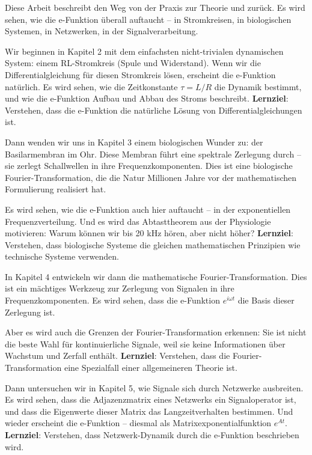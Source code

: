 ﻿\documentclass[a4paper,12pt]{report}
\theoremstyle{definition}
\begin{document}
	Diese Arbeit beschreibt den Weg von der Praxis zur Theorie und zurück. Es wird sehen, wie die e-Funktion überall auftaucht -- in Stromkreisen, in biologischen Systemen, in Netzwerken, in der Signalverarbeitung.
	
	Wir beginnen in Kapitel 2 mit dem einfachsten nicht-trivialen dynamischen System: einem RL-Strom\-kreis (Spule und Widerstand). Wenn wir die Differentialgleichung für diesen Stromkreis lösen, erscheint die e-Funktion natürlich. Es wird sehen, wie die Zeitkonstante $\tau = L/R$ die Dynamik bestimmt, und wie die e-Funktion Aufbau und Abbau des Stroms beschreibt. \textbf{Lernziel}: Verstehen, dass die e-Funktion die natürliche Lösung von Differentialgleichungen ist.
	
	Dann wenden wir uns in Kapitel 3 einem biologischen Wunder zu: der Basilarmembran im Ohr. Diese Membran führt eine spektrale Zerlegung durch -- sie zerlegt Schallwellen in ihre Frequenzkomponenten. Dies ist eine biologische Fourier-Transformation, die die Natur Millionen Jahre vor der mathematischen Formulierung realisiert hat.
	
	Es wird sehen, wie die e-Funktion auch hier auftaucht -- in der exponentiellen Frequenzverteilung. Und es wird das Abtasttheorem aus der Physiologie motivieren: Warum können wir bis 20 kHz hören, aber nicht höher? \textbf{Lernziel}: Verstehen, dass biologische Systeme die gleichen mathematischen Prinzipien wie technische Systeme verwenden.
	
	In Kapitel 4 entwickeln wir dann die mathematische Fourier-Transformation. Dies ist ein mächtiges Werkzeug zur Zerlegung von Signalen in ihre Frequenzkomponenten. Es wird sehen, dass die e-Funktion $e^{i\omega t}$ die Basis dieser Zerlegung ist.
	
	Aber es wird auch die Grenzen der Fourier-Transformation erkennen: Sie ist nicht die beste Wahl für kontinuierliche Signale, weil sie keine Informationen über Wachstum und Zerfall enthält. \textbf{Lernziel}: Verstehen, dass die Fourier-Transformation eine Spezialfall einer allgemeineren Theorie ist.
	
	Dann untersuchen wir in Kapitel 5, wie Signale sich durch Netzwerke ausbreiten. Es wird sehen, dass die Adjazenzmatrix eines Netzwerks ein Signaloperator ist, und dass die Eigenwerte dieser Matrix das Langzeitverhalten bestimmen. Und wieder erscheint die e-Funktion -- diesmal als Matrixexponentialfunktion $e^{At}$. \textbf{Lernziel}: Verstehen, dass Netzwerk-Dynamik durch die e-Funktion beschrieben wird.
	
\end{document}

